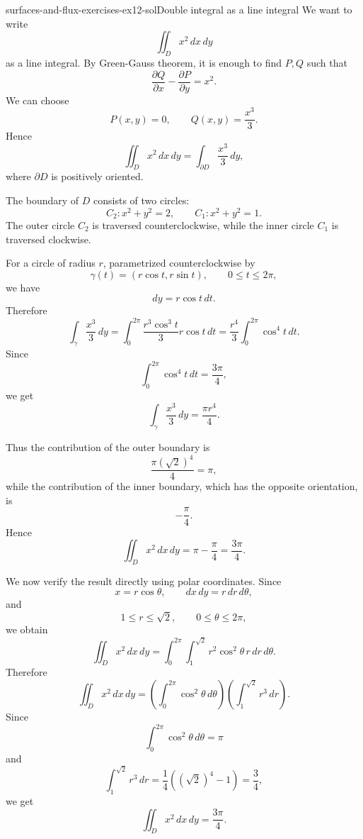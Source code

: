 \documentclass[preview]{standalone}
\begin{document}
\begin{snippetsolution}{surfaces-and-flux-exercises-ex12-sol}{Double integral as a line integral}
    We want to write
    \[
        \iint_D x^2\,dx\,dy
    \]
    as a line integral. By Green-Gauss theorem, it is enough to find \(P,Q\) such that
    \[
        \frac{\partial Q}{\partial x}
        -
        \frac{\partial P}{\partial y}
        =
        x^2.
    \]
    We can choose
    \[
        P(x,y)=0,
        \qquad
        Q(x,y)=\frac{x^3}{3}.
    \]
    Hence
    \[
        \iint_D x^2\,dx\,dy
        =
        \int_{\partial D}\frac{x^3}{3}\,dy,
    \]
    where \(\partial D\) is positively oriented.

    The boundary of \(D\) consists of two circles:
    \[
        C_2:x^2+y^2=2,
        \qquad
        C_1:x^2+y^2=1.
    \]
    The outer circle \(C_2\) is traversed counterclockwise, while the inner circle \(C_1\) is traversed clockwise.

    For a circle of radius \(r\), parametrized counterclockwise by
    \[
        \gamma(t)=(r\cos t,r\sin t),
        \qquad 0\leq t\leq 2\pi,
    \]
    we have
    \[
        dy=r\cos t\,dt.
    \]
    Therefore
    \[
        \int_\gamma \frac{x^3}{3}\,dy
        =
        \int_0^{2\pi}
        \frac{r^3\cos^3 t}{3}r\cos t\,dt
        =
        \frac{r^4}{3}\int_0^{2\pi}\cos^4 t\,dt.
    \]
    Since
    \[
        \int_0^{2\pi}\cos^4 t\,dt=\frac{3\pi}{4},
    \]
    we get
    \[
        \int_\gamma \frac{x^3}{3}\,dy
        =
        \frac{\pi r^4}{4}.
    \]

    Thus the contribution of the outer boundary is
    \[
        \frac{\pi(\sqrt{2})^4}{4}=\pi,
    \]
    while the contribution of the inner boundary, which has the opposite orientation, is
    \[
        -\frac{\pi}{4}.
    \]
    Hence
    \[
        \iint_D x^2\,dx\,dy
        =
        \pi-\frac{\pi}{4}
        =
        \frac{3\pi}{4}.
    \]

    We now verify the result directly using polar coordinates. Since
    \[
        x=r\cos\theta,
        \qquad
        dx\,dy=r\,dr\,d\theta,
    \]
    and
    \[
        1\leq r\leq \sqrt{2},
        \qquad
        0\leq \theta\leq 2\pi,
    \]
    we obtain
    \[
        \iint_D x^2\,dx\,dy
        =
        \int_0^{2\pi}\int_1^{\sqrt{2}}
        r^2\cos^2\theta\,r\,dr\,d\theta.
    \]
    Therefore
    \[
        \iint_D x^2\,dx\,dy
        =
        \left(\int_0^{2\pi}\cos^2\theta\,d\theta\right)
        \left(\int_1^{\sqrt{2}}r^3\,dr\right).
    \]
    Since
    \[
        \int_0^{2\pi}\cos^2\theta\,d\theta=\pi
    \]
    and
    \[
        \int_1^{\sqrt{2}}r^3\,dr
        =
        \frac{1}{4}\left((\sqrt{2})^4-1\right)
        =
        \frac{3}{4},
    \]
    we get
    \[
        \iint_D x^2\,dx\,dy
        =
        \frac{3\pi}{4}.
    \]
\end{snippetsolution}
\end{document}
